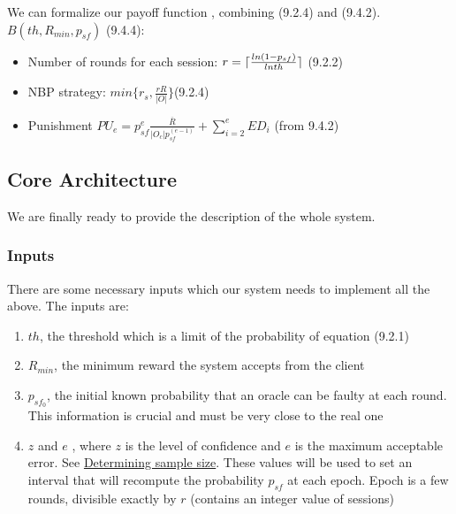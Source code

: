 \documentclass{article}
\DeclarePairedDelimiter{\ceil}{\lceil}{\rceil}
\begin{document}
We can formalize our payoff function , combining (9.2.4) and (9.4.2).\\
$B(th,R_{min},p_{sf})$ (9.4.4):\\
\begin{itemize}
\item Number of rounds for each session: $r=\ceil{\frac{ln{(1-p_{sf}})}{lnth}}$ (9.2.2)
\item NBP strategy: $min\{r_s,\frac{rR}{|O|}\}$(9.2.4)
\item Punishment $PU_e=p_{sf}^e\frac{\overline{R}}{|O_c|p_{sf}^{(e-1)}}+\displaystyle\sum_{i=2}^e{ED}_i$ (from 9.4.2)
\end{itemize}

\subsection{Core Architecture}
We are finally ready to provide the description of the whole system. 

\subsubsection{Inputs}
There are some necessary inputs which our system needs to implement all the above. The inputs are:\\
\begin{enumerate}
\item $th$, the threshold which is a limit of the probability of equation (9.2.1)
\item $R_{min}$, the minimum reward the system accepts from the client
\item $p_{sf_0}$, the initial known probability that an oracle can be faulty at each round. This information is crucial and must be very close to the real one
\item $z$ and $e$ , where $z$ is the level of confidence and $e$ is the maximum acceptable error. See \hyperlink{2}{Determining sample size}. These values will be used to set an interval that will recompute the probability  $p_{sf}$ at each epoch. Epoch is a few rounds, divisible exactly by $r$ (contains an integer value of sessions)
\end{enumerate}
\end{document}
